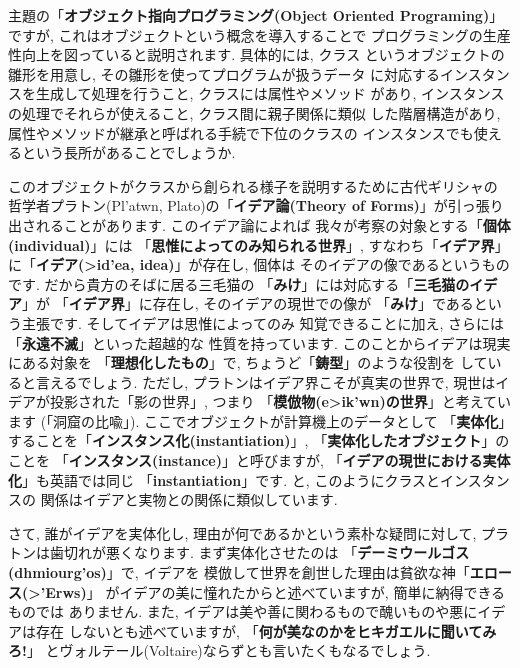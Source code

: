 主題の「\textbf{オブジェクト指向プログラミング(Object Oriented
 Programing)}」ですが, これはオブジェクトという概念を導入することで
プログラミングの生産性向上を図っていると説明されます. 具体的には, クラス
というオブジェクトの雛形を用意し, その雛形を使ってプログラムが扱うデータ
に対応するインスタンスを生成して処理を行うこと, クラスには属性やメソッド
があり, インスタンスの処理でそれらが使えること, クラス間に親子関係に類似
した階層構造があり, 属性やメソッドが継承と呼ばれる手続で下位のクラスの
インスタンスでも使えるという長所があることでしょうか.
\newline

このオブジェクトがクラスから創られる様子を説明するために古代ギリシャの
哲学者プラトン(\textgreek{Pl'atwn}, Plato)の「\textbf{イデア論(Theory
 of Forms)}」が引っ張り出されることがあります. このイデア論によれば
我々が考察の対象とする「\textbf{個体(individual)}」には
「\textbf{思惟によってのみ知られる世界}」, すなわち「\textbf{イデア界}」
に「\textbf{イデア(\textgreek{>id'ea}, idea)}」が存在し, 個体は
そのイデアの像であるというものです. だから貴方のそばに居る三毛猫の
「\textbf{みけ}」には対応する「\textbf{三毛猫のイデア}」が
「\textbf{イデア界}」に存在し, そのイデアの現世での像が
「\textbf{みけ}」であるという主張です. そしてイデアは思惟によってのみ
知覚できることに加え, さらには「\textbf{永遠不滅}」といった超越的な
性質を持っています. このことからイデアは現実にある対象を
「\textbf{理想化したもの}」で, ちょうど「\textbf{鋳型}」のような役割を
していると言えるでしょう. ただし, プラトンはイデア界こそが真実の世界で,
 現世はイデアが投影された「影の世界」, つまり
「\textbf{模倣物(\textgreek{e>ik'wn})の世界}」と考えています
(「洞窟の比喩」\cite{国家}). ここでオブジェクトが計算機上のデータとして
「\textbf{実体化}」することを「\textbf{インスタンス化(instantiation)}」, 
「\textbf{実体化したオブジェクト}」のことを
「\textbf{インスタンス(instance)}」と呼びますが, 
「\textbf{イデアの現世における実体化}」も英語では同じ
「\textbf{instantiation}」です. と, このようにクラスとインスタンスの
関係はイデアと実物との関係に類似しています. 
\newline

さて, 誰がイデアを実体化し, 理由が何であるかという素朴な疑問に対して,
 プラトンは歯切れが悪くなります. まず実体化させたのは
 「\textbf{デーミウールゴス(\textgreek{dhmiourg'os})}」で, イデアを
模倣して世界を創世した理由は貧欲な神「\textbf{エロース(\textgreek{>'Erws})}」
がイデアの美に憧れたからと述べていますが, 簡単に納得できるものでは
ありません. また, イデアは美や善に関わるもので醜いものや悪にイデアは存在
しないとも述べていますが, 「\textbf{何が美なのかをヒキガエルに聞いてみろ!}」
とヴォルテール(Voltaire)ならずとも言いたくもなるでしょう.
\newline


